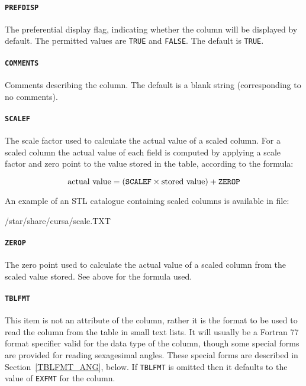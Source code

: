 \documentclass[twoside,11pt]{starlink}
\begin{document}
\paragraph{\texttt{PREFDISP}}  The preferential display flag, indicating
whether the column will be displayed by default.
The permitted values are \texttt{TRUE} and \texttt{FALSE}.
The default is \texttt{TRUE}.

\paragraph{\texttt{COMMENTS}}  Comments describing the column.  The default
is a blank string (corresponding to no comments).

\paragraph{\texttt{SCALEF}} The scale factor used to calculate the actual
value of a scaled column.  For a scaled column the actual value of each
field is computed by applying a scale factor and zero point to the value
stored in the table, according to the formula:

\begin{equation}
{\rm actual~value} =
                ( \texttt{SCALEF} \times {\rm stored~value} ) + \texttt{ZEROP}
\end{equation}

An example of an STL catalogue containing scaled columns is available in
file:

\begin{terminalv}
/star/share/cursa/scale.TXT
\end{terminalv}

\paragraph{\texttt{ZEROP}} The zero point used to calculate the actual value
of a scaled column from the scaled value stored. See above for the
formula used.

\paragraph{\texttt{TBLFMT}} This item is not an attribute of the column,
rather it is the format to be used to read the column from the table
in small text lists.  It will usually be a Fortran 77 format specifier
valid for the data type of the column, though some special forms are
provided for reading sexagesimal angles.  These special forms are
described in Section~\ref{TBLFMT_ANG}, below.  If \texttt{TBLFMT} is
omitted then it defaults to the value of \texttt{EXFMT} for the column.
\end{document}
